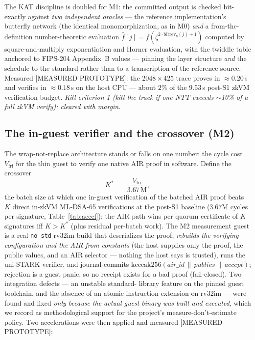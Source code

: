\documentclass[11pt]{article}
\newcommand{\code}[1]{\texttt{#1}}
\newcommand{\mldsa}{ML\mbox{-}DSA\mbox{-}65}
\newcommand{\concat}{\,\|\,}
\newcommand{\statusM}{\textcolor{statblue}{\textsf{\scriptsize[MEASURED PROTOTYPE]}}}
\theoremstyle{plain}
\theoremstyle{definition}
\theoremstyle{remark}
\begin{document}
The KAT discipline is doubled for M1: the committed output is checked
bit-exactly against \emph{two independent oracles} --- the reference
implementation's butterfly network (the identical monomorphization, as in
M0) \emph{and} a from-the-definition number-theoretic evaluation
$\hat{f}[j] = f(\zeta^{2 \cdot \mathrm{bitrev}_8(j) + 1})$ computed by
square-and-multiply exponentiation and Horner evaluation, with the twiddle
table anchored to FIPS-204 Appendix~B values --- pinning the layer
structure \emph{and} the schedule to the standard rather than to a
transcription of the reference source. Measured \statusM{}: the
$2048 \times 425$ trace proves in $\approx 0.20$\,s and verifies in
$\approx 0.18$\,s on the host CPU --- about $2\%$ of the $9.53$\,s
post-S1 zkVM verification budget. \emph{Kill criterion 1 (kill the track if
one NTT exceeds $\sim$10\% of a full zkVM verify): cleared with margin.}

\subsection{The in-guest verifier and the crossover (M2)}
\label{sec:air-guest}

The wrap-not-replace architecture stands or falls on one number: the cycle
cost $V_{\mathrm{fri}}$ for the thin guest to verify one native AIR proof in
software. Define the crossover
\[
K^\ast \;=\; \frac{V_{\mathrm{fri}}}{3.67\,\mathrm{M}},
\]
the batch size at which one in-guest verification of the batched AIR proof
beats $K$ direct in-zkVM \mldsa{} verifications at the post-S1 baseline
($3.67$M cycles per signature, Table~\ref{tab:accel}); the AIR path wins
per quorum certificate of $K$ signatures iff $K > K^\ast$ (plus residual
per-batch work). The M2 measurement guest is a real \code{no\_std} rv32im
build that deserializes the proof, \emph{rebuilds the verifying
configuration and the AIR from constants} (the host supplies only the proof,
the public values, and an AIR selector --- nothing the host says is
trusted), runs the uni-STARK verifier, and journal-commits
$\mathrm{keccak256}(\mathit{air\_id} \concat \mathit{publics} \concat
\mathit{accept})$; rejection is a guest panic, so no receipt exists for a
bad proof (fail-closed). Two integration defects --- an unstable standard-%
library feature on the pinned guest toolchain, and the absence of an atomic
instruction extension on rv32im --- were found and fixed \emph{only because
the actual guest binary was built and executed}, which we record as
methodological support for the project's measure-don't-estimate policy.
Two accelerations were then applied and measured \statusM{}:
\end{document}
